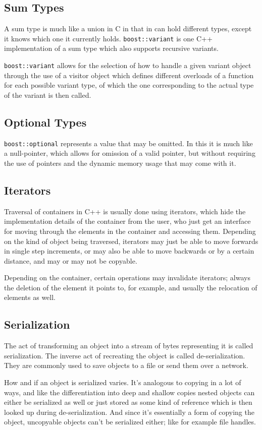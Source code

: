 		\subsection{Sum Types}
		
		A sum type is much like a union in C in that in can hold different types, except it knows which one it currently holds. \lstinline$boost::variant$ is one C++ implementation of a sum type which also supports recursive variants.
		
		\lstinline$boost::variant$ allows for the selection of how to handle a given variant object through the use of a visitor object which defines different overloads of a function for each possible variant type, of which the one corresponding to the actual type of the variant is then called.
		
		\subsection{Optional Types}
		
		\lstinline$boost::optional$ represents a value that may be omitted. In this it is much like a null-pointer, which allows for omission of a valid pointer, but without requiring the use of pointers and the dynamic memory usage that may come with it.
		
		\subsection{Iterators}
		
		Traversal of containers in C++ is usually done using iterators, which hide the implementation details of the container from the user, who just get an interface for moving through the elements in the container and accessing them. Depending on the kind of object being traversed, iterators may just be able to move forwards in single step increments, or may also be able to move backwards or by a certain distance, and may or may not be copyable.
		
		Depending on the container, certain operations may invalidate iterators; always the deletion of the element it points to, for example, and usually the relocation of elements as well.
		
		\subsection{Serialization}
		
		The act of transforming an object into a stream of bytes representing it is called serialization. The inverse act of recreating the object is called de-serialization. They are commonly used to save objects to a file or send them over a network.
		
		How and if an object is serialized varies. It's analogous to copying in a lot of ways, and like the differentiation into deep and shallow copies nested objects can either be serialized as well or just stored as some kind of reference which is then looked up during de-serialization. And since it's essentially a form of copying the object, uncopyable objects can't be serialized either; like for example file handles.
